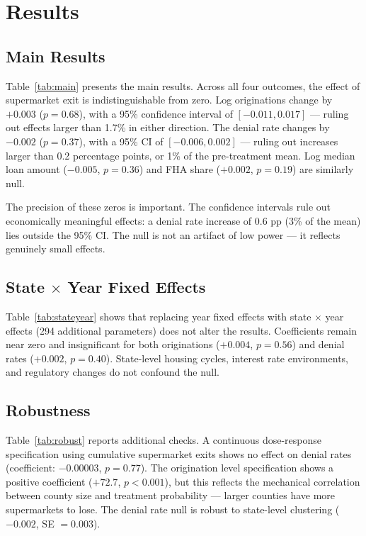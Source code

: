 \documentclass[12pt]{article}
\begin{document}
\section{Results}

\subsection{Main Results}



Table~\ref{tab:main} presents the main results. Across all four outcomes, the effect of supermarket exit is indistinguishable from zero. Log originations change by $+0.003$ ($p = 0.68$), with a 95\% confidence interval of $[-0.011, 0.017]$ --- ruling out effects larger than 1.7\% in either direction. The denial rate changes by $-0.002$ ($p = 0.37$), with a 95\% CI of $[-0.006, 0.002]$ --- ruling out increases larger than 0.2 percentage points, or 1\% of the pre-treatment mean. Log median loan amount ($-0.005$, $p = 0.36$) and FHA share ($+0.002$, $p = 0.19$) are similarly null.

The precision of these zeros is important. The confidence intervals rule out economically meaningful effects: a denial rate increase of 0.6 pp (3\% of the mean) lies outside the 95\% CI. The null is not an artifact of low power --- it reflects genuinely small effects.

\subsection{State $\times$ Year Fixed Effects}



Table~\ref{tab:stateyear} shows that replacing year fixed effects with state $\times$ year effects (294 additional parameters) does not alter the results. Coefficients remain near zero and insignificant for both originations ($+0.004$, $p = 0.56$) and denial rates ($+0.002$, $p = 0.40$). State-level housing cycles, interest rate environments, and regulatory changes do not confound the null.

\subsection{Robustness}



Table~\ref{tab:robust} reports additional checks. A continuous dose-response specification using cumulative supermarket exits shows no effect on denial rates (coefficient: $-0.00003$, $p = 0.77$). The origination level specification shows a positive coefficient ($+72.7$, $p < 0.001$), but this reflects the mechanical correlation between county size and treatment probability --- larger counties have more supermarkets to lose. The denial rate null is robust to state-level clustering ($-0.002$, SE $= 0.003$).
\end{document}
